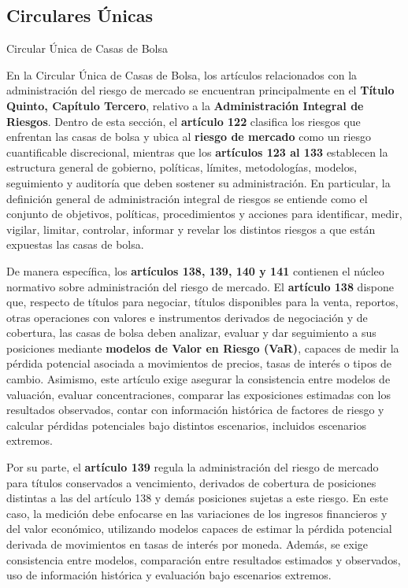 \subsection{Circulares Únicas}

{Circular Única de Casas de Bolsa}

En la Circular Única de Casas de Bolsa, los artículos relacionados con la administración del riesgo de mercado se encuentran principalmente en el \textbf{Título Quinto, Capítulo Tercero}, relativo a la \textbf{Administración Integral de Riesgos}. Dentro de esta sección, el \textbf{artículo 122} clasifica los riesgos que enfrentan las casas de bolsa y ubica al \textbf{riesgo de mercado} como un riesgo cuantificable discrecional, mientras que los \textbf{artículos 123 al 133} establecen la estructura general de gobierno, políticas, límites, metodologías, modelos, seguimiento y auditoría que deben sostener su administración. En particular, la definición general de administración integral de riesgos se entiende como el conjunto de objetivos, políticas, procedimientos y acciones para identificar, medir, vigilar, limitar, controlar, informar y revelar los distintos riesgos a que están expuestas las casas de bolsa.

De manera específica, los \textbf{artículos 138, 139, 140 y 141} contienen el núcleo normativo sobre administración del riesgo de mercado. El \textbf{artículo 138} dispone que, respecto de títulos para negociar, títulos disponibles para la venta, reportos, otras operaciones con valores e instrumentos derivados de negociación y de cobertura, las casas de bolsa deben analizar, evaluar y dar seguimiento a sus posiciones mediante \textbf{modelos de Valor en Riesgo (VaR)}, capaces de medir la pérdida potencial asociada a movimientos de precios, tasas de interés o tipos de cambio. Asimismo, este artículo exige asegurar la consistencia entre modelos de valuación, evaluar concentraciones, comparar las exposiciones estimadas con los resultados observados, contar con información histórica de factores de riesgo y calcular pérdidas potenciales bajo distintos escenarios, incluidos escenarios extremos.

Por su parte, el \textbf{artículo 139} regula la administración del riesgo de mercado para títulos conservados a vencimiento, derivados de cobertura de posiciones distintas a las del artículo 138 y demás posiciones sujetas a este riesgo. En este caso, la medición debe enfocarse en las variaciones de los ingresos financieros y del valor económico, utilizando modelos capaces de estimar la pérdida potencial derivada de movimientos en tasas de interés por moneda. Además, se exige consistencia entre modelos, comparación entre resultados estimados y observados, uso de información histórica y evaluación bajo escenarios extremos.

